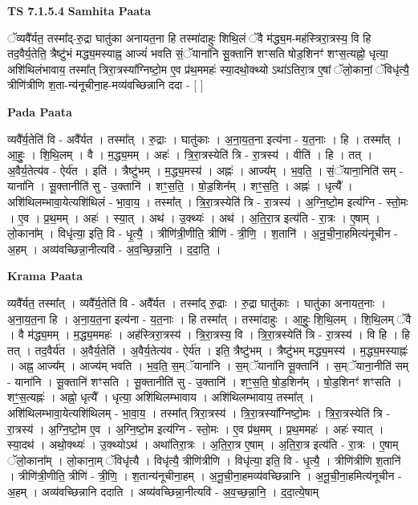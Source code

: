 \documentclass[17pt]{extarticle}
\begin{document}
\textbf{TS 7.1.5.4 } \newline
\textbf{Samhita Paata} \newline

ॅव्यवै᳚र्यत॒ तस्मा᳚द्-रु॒द्रा घातु॑का अनायत॒ना हि तस्मा॑दाहुः शिथि॒लं ॅवै म॑द्ध्य॒म-मह॑स्त्रिरा॒त्रस्य॒ वि हि तद॒वैर्य॒तेति॒ त्रैष्टु॑भं मद्ध्य॒मस्याह्न॒ आज्यं॑ भवति सं॒ॅयाना॑नि सू॒क्तानि॑ शꣳसति षोड॒शिनꣳ॑ शꣳस॒त्यह्नो॒ धृत्या॒ अशि॑थिलंभावाय॒ तस्मा᳚त् त्रिरा॒त्रस्या᳚ग्निष्टो॒म ए॒व प्र॑थ॒ममहः॑ स्या॒दथो॒क्थ्यो ऽथा॑ऽतिरा॒त्र ए॒षां ॅलो॒कानां॒ ॅविधृ॑त्यै॒ त्रीणि॑त्रीणि श॒ता-न्य॑नूचीना॒ह-मव्य॑वच्छिन्नानि ददा - [  ] \newline

\textbf{Pada Paata} \newline

व्यवै᳚र्य॒तेति॑ वि - अवै᳚र्यत । तस्मा᳚त् । रु॒द्राः । घातु॑काः । अ॒ना॒य॒त॒ना इत्य॑ना - य॒त॒नाः । हि । तस्मा᳚त् । आ॒हुः॒ । शि॒थि॒लम् । वै । म॒द्ध्य॒मम् । अहः॑ । त्रि॒रा॒त्रस्येति॑ त्रि - रा॒त्रस्य॑ । वीति॑ । हि । तत् । अ॒वैर्य॒तेत्य॑व - ऐर्य॑त । इति॑ । त्रैष्टु॑भम् । म॒द्ध्य॒मस्य॑ । अह्नः॑ । आज्य᳚म् । भ॒व॒ति॒ । सं॒ॅयाना॒निति॑ सम् - याना॑नि । सू॒क्तानीति॑ सु - उ॒क्तानि॑ । शꣳ॒॒स॒ति॒ । षो॒ड॒शिन᳚म् । शꣳ॒॒स॒ति॒ । अह्नः॑ । धृत्यै᳚ । अशि॑थिलम्भावा॒येत्यशि॑थिलं - भा॒वा॒य॒ । तस्मा᳚त् । त्रि॒रा॒त्रस्येति॑ त्रि - रा॒त्रस्य॑ । अ॒ग्नि॒ष्टो॒म इत्य॑ग्नि - स्तो॒मः । ए॒व । प्र॒थ॒मम् । अहः॑ । स्या॒त् । अथ॑ । उ॒क्थ्यः॑ । अथ॑ । अ॒ति॒रा॒त्र इत्य॑ति - रा॒त्रः । ए॒षाम् । लो॒काना᳚म् । विधृ॑त्या॒ इति॒ वि - धृ॒त्यै॒ । त्रीणि॑त्री॒णीति॒ त्रीणि॑ - त्री॒णि॒ । श॒तानि॑ । अ॒नू॒ची॒ना॒हमित्य॑नूचीन - अ॒हम् । अव्य॑वच्छिन्ना॒नीत्यवि॑ - अ॒व॒च्छि॒न्ना॒नि॒ । द॒दा॒ति॒ ।  \newline


\textbf{Krama Paata} \newline

व्यवै᳚र्यत॒ तस्मा᳚त् । व्यवै᳚र्य॒तेति॑ वि - अवै᳚र्यत । तस्मा᳚द् रु॒द्राः । रु॒द्रा घातु॑काः । घातु॑का अनायत॒नाः । अ॒ना॒य॒त॒ना हि । अ॒ना॒य॒त॒ना इत्य॑ना - य॒त॒नाः । हि तस्मा᳚त् । तस्मा॑दाहुः । आ॒हुः॒ शि॒थि॒लम् । शि॒थि॒लम् ॅवै । वै म॑द्ध्य॒मम् । म॒द्ध्य॒ममहः॑ । अह॑स्त्रिरा॒त्रस्य॑ । त्रि॒रा॒त्रस्य॒ वि । त्रि॒रा॒त्रस्येति॑ त्रि - रा॒त्रस्य॑ । वि हि । हि तत् । तद॒वैर्य॑त । अ॒वैर्य॒तेति॑ । अ॒वैर्य॒तेत्य॑व - ऐर्य॑त । इति॒ त्रैष्टु॑भम् । त्रैष्टु॑भम् मद्ध्य॒मस्य॑ । म॒द्ध्य॒मस्याह्नः॑ । अह्न॒ आज्य᳚म् । आज्य॑म् भवति । भ॒व॒ति॒ स॒म्ॅयाना॑नि । स॒म्ॅयाना॑नि सू॒क्तानि॑ । स॒म्ॅयाना॒नीति॑ सम् - याना॑नि । सू॒क्तानि॑ शꣳसति । सू॒क्तानीति॑ सु - उ॒क्तानि॑ । शꣳ॒॒स॒ति॒ षो॒ड॒शिन᳚म् । षो॒ड॒शिनꣳ॑ शꣳसति । शꣳ॒॒स॒त्यह्नः॑ । अह्नो॒ धृत्यै᳚ । धृत्या॒ अशि॑थिलम्भावाय । अशि॑थिलम्भावाय॒ तस्मा᳚त् । अशि॑थिलम्भावा॒येत्यशि॑थिलम् - भा॒वा॒य॒ । तस्मा᳚त् त्रिरा॒त्रस्य॑ । त्रि॒रा॒त्रस्या᳚ग्निष्टो॒मः । त्रि॒रा॒त्रस्येति॑ त्रि - रा॒त्रस्य॑ । अ॒ग्नि॒ष्टो॒म ए॒व । अ॒ग्नि॒ष्टो॒म इत्य॑ग्नि - स्तो॒मः । ए॒व प्र॑थ॒मम् । प्र॒थ॒ममहः॑ । अहः॑ स्यात् । स्या॒दथ॑ । अथो॒क्थ्यः॑ । उ॒क्थ्योऽथ॑ । अथा॑तिरा॒त्रः । अ॒ति॒रा॒त्र ए॒षाम् । अ॒ति॒रा॒त्र इत्य॑ति - रा॒त्रः । ए॒षाम् ॅलो॒काना᳚म् । लो॒काना॒म् ॅविधृ॑त्यै । विधृ॑त्यै॒ त्रीणि॑त्रीणि । विधृ॑त्या॒ इति॒ वि - धृ॒त्यै॒ । त्रीणि॑त्रीणि श॒तानि॑ । त्रीणि॑त्री॒णीति॒ त्रीणि॑ - त्री॒णि॒ । श॒तान्य॑नूचीना॒हम् । अ॒नू॒ची॒ना॒हमव्य॑वच्छिन्नानि । अ॒नू॒ची॒ना॒हमित्य॑नूचीन - अ॒हम् । अव्य॑वच्छिन्नानि ददाति । अव्य॑वच्छिन्ना॒नीत्यवि॑ - अ॒व॒च्छ॒न्ना॒नि॒ । द॒दा॒त्ये॒षाम् \newline
\end{document}
